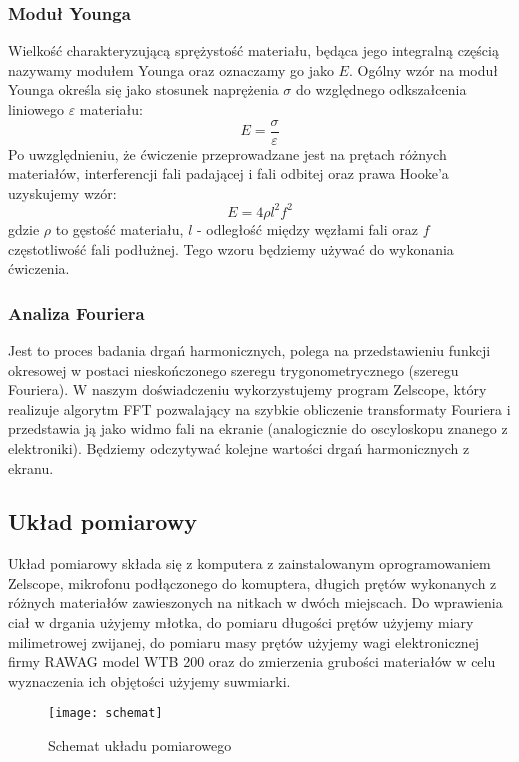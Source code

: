 \documentclass[a4paper,12pts]{article}
\begin{document}
\subsubsection{Moduł Younga}
Wielkość charakteryzującą sprężystość materiału, będąca jego integralną częścią nazywamy modułem Younga oraz oznaczamy go jako $E$. Ogólny wzór na moduł Younga określa się jako stosunek naprężenia $\sigma$ do względnego odkszałcenia liniowego $\varepsilon$ materiału:
\begin{equation}
E = \frac{\sigma}{\varepsilon}
\end{equation}
Po uwzględnieniu, że ćwiczenie przeprowadzane jest na prętach różnych materiałów, interferencji fali padającej i fali odbitej oraz prawa Hooke'a uzyskujemy wzór:
\begin{equation}
E = 4 \rho l^2 f^2
\end{equation}
gdzie $\rho$ to gęstość materiału, $l$ - odległość między węzłami fali oraz $f$ częstotliwość fali podłużnej. Tego wzoru będziemy używać do wykonania ćwiczenia.


\subsubsection{Analiza Fouriera}
Jest to proces badania drgań harmonicznych, polega na przedstawieniu funkcji okresowej w postaci nieskończonego szeregu trygonometrycznego (szeregu Fouriera). W naszym doświadczeniu wykorzystujemy program Zelscope, który realizuje algorytm FFT pozwalający na szybkie obliczenie transformaty Fouriera i przedstawia ją jako widmo fali na ekranie (analogicznie do oscyloskopu znanego z elektroniki). Będziemy odczytywać kolejne wartości drgań harmonicznych z ekranu.

\subsection{Układ pomiarowy}
Układ pomiarowy składa się z komputera z zainstalowanym oprogramowaniem Zelscope, mikrofonu podłączonego do komuptera, długich prętów wykonanych z różnych materiałów zawieszonych na nitkach w dwóch miejscach. Do wprawienia ciał w drgania użyjemy młotka, do pomiaru długości prętów użyjemy miary milimetrowej zwijanej, do pomiaru masy prętów użyjemy wagi elektronicznej firmy RAWAG model WTB 200 oraz do zmierzenia grubości materiałów w celu wyznaczenia ich objętości użyjemy suwmiarki.

\begin{figure}[!h]
	\centering
	\texttt{[image: schemat]}
	\caption{Schemat układu pomiarowego}
	\label{schematUkladu}
\end{figure}
\end{document}
